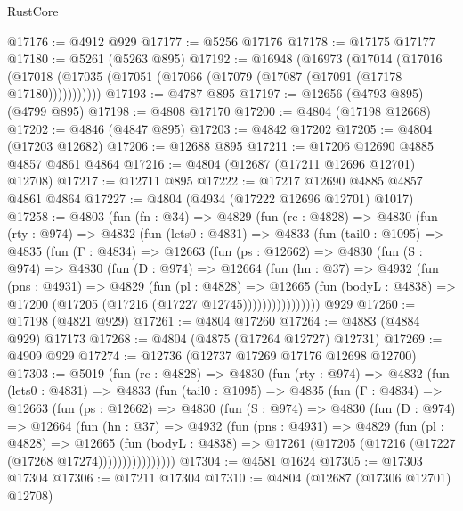 \begin{lexlean}{RustCore}
\begin{coremodule}
@17176 := @4912 @929
@17177 := @5256 @17176
@17178 := @17175 @17177
@17180 := @5261 (@5263 @895)
@17192 := @16948
    (@16973
      (@17014
        (@17016 (@17018 (@17035 (@17051 (@17066 (@17079 (@17087 (@17091 (@17178 @17180)))))))))))
@17193 := @4787 @895
@17197 := @12656 (@4793 @895) (@4799 @895)
@17198 := @4808 @17170
@17200 := @4804 (@17198 @12668)
@17202 := @4846 (@4847 @895)
@17203 := @4842 @17202
@17205 := @4804 (@17203 @12682)
@17206 := @12688 @895
@17211 := @17206 @12690 @4885 @4857 @4861 @4864
@17216 := @4804 (@12687 (@17211 @12696 @12701) @12708)
@17217 := @12711 @895
@17222 := @17217 @12690 @4885 @4857 @4861 @4864
@17227 := @4804 (@4934 (@17222 @12696 @12701) @1017)
@17258 := @4803
    (fun (fn : @34) =>
    @4829
      (fun (rc : @4828) =>
      @4830
        (fun (rty : @974) =>
        @4832
          (fun (lets0 : @4831) =>
          @4833
            (fun (tail0 : @1095) =>
            @4835
              (fun (Γ : @4834) =>
              @12663
                (fun (ps : @12662) =>
                @4830
                  (fun (S : @974) =>
                  @4830
                    (fun (D : @974) =>
                    @12664
                      (fun (hn : @37) =>
                      @4932
                        (fun (pns : @4931) =>
                        @4829
                          (fun (pl : @4828) =>
                          @12665
                            (fun (bodyL : @4838) =>
                            @17200 (@17205 (@17216 (@17227 @12745))))))))))))))))
    @929
@17260 := @17198 (@4821 @929)
@17261 := @4804 @17260
@17264 := @4883 (@4884 @929) @17173
@17268 := @4804 (@4875 (@17264 @12727) @12731)
@17269 := @4909 @929
@17274 := @12736 (@12737 @17269 @17176 @12698 @12700)
@17303 := @5019
    (fun (rc : @4828) =>
    @4830
      (fun (rty : @974) =>
      @4832
        (fun (lets0 : @4831) =>
        @4833
          (fun (tail0 : @1095) =>
          @4835
            (fun (Γ : @4834) =>
            @12663
              (fun (ps : @12662) =>
              @4830
                (fun (S : @974) =>
                @4830
                  (fun (D : @974) =>
                  @12664
                    (fun (hn : @37) =>
                    @4932
                      (fun (pns : @4931) =>
                      @4829
                        (fun (pl : @4828) =>
                        @12665
                          (fun (bodyL : @4838) =>
                          @17261 (@17205 (@17216 (@17227 (@17268 @17274))))))))))))))))
@17304 := @4581 @1624
@17305 := @17303 @17304
@17306 := @17211 @17304
@17310 := @4804 (@12687 (@17306 @12701) @12708)

\end{coremodule}
\end{lexlean}
